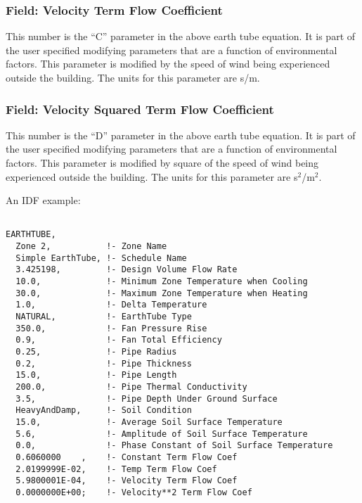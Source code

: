 \subsubsection{Field: Velocity Term Flow Coefficient}\label{field-velocity-term-flow-coefficient}

This number is the ``C'' parameter in the above earth tube equation. It is part of the user specified modifying parameters that are a function of environmental factors. This parameter is modified by the speed of wind being experienced outside the building. The units for this parameter are s/m.

\subsubsection{Field: Velocity Squared Term Flow Coefficient}\label{field-velocity-squared-term-flow-coefficient}

This number is the ``D'' parameter in the above earth tube equation. It is part of the user specified modifying parameters that are a function of environmental factors. This parameter is modified by square of the speed of wind being experienced outside the building. The units for this parameter are s\(^{2}\)/m\(^{2}\).

An IDF example:

\begin{lstlisting}

EARTHTUBE,
  Zone 2,           !- Zone Name
  Simple EarthTube, !- Schedule Name
  3.425198,         !- Design Volume Flow Rate
  10.0,             !- Minimum Zone Temperature when Cooling
  30.0,             !- Maximum Zone Temperature when Heating
  1.0,              !- Delta Temperature
  NATURAL,          !- EarthTube Type
  350.0,            !- Fan Pressure Rise
  0.9,              !- Fan Total Efficiency
  0.25,             !- Pipe Radius
  0.2,              !- Pipe Thickness
  15.0,             !- Pipe Length
  200.0,            !- Pipe Thermal Conductivity
  3.5,              !- Pipe Depth Under Ground Surface
  HeavyAndDamp,     !- Soil Condition
  15.0,             !- Average Soil Surface Temperature
  5.6,              !- Amplitude of Soil Surface Temperature
  0.0,              !- Phase Constant of Soil Surface Temperature
  0.6060000    ,    !- Constant Term Flow Coef
  2.0199999E-02,    !- Temp Term Flow Coef
  5.9800001E-04,    !- Velocity Term Flow Coef
  0.0000000E+00;    !- Velocity**2 Term Flow Coef
\end{lstlisting}

